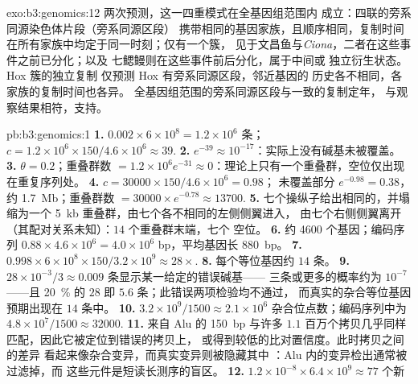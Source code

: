 \begin{solution}{exo:b3:genomics:12}
两次预测，这一四重模式在全基因组范围内
成立：四联的旁系同源染色体片段（旁系同源区段）
携带相同的基因家族，且顺序相同，复制时间
在所有家族中均定于同一时刻；仅有一个簇，
见于文昌鱼与\emph{Ciona}，二者在这些事件之前已分化；以及
七鳃鳗则在这些事件前后分化，属于中间或
独立衍生状态。Hox 簇的独立复制
仅预测 Hox 有旁系同源区段，邻近基因的
历史各不相同，各家族的复制时间也各异。
全基因组范围的旁系同源区段与一致的复制定年，
与观察结果相符，支持。
\end{solution}

\begin{solution}{pb:b3:genomics:1}
\textbf{1.} $0.002\times 6\times 10^{8} = 1.2\times 10^{6}$ 条；
$c = 1.2\times 10^{6}\times 150/4.6\times 10^{6} \approx 39$.
\textbf{2.} $e^{-39} \approx 10^{-17}$：实际上没有碱基未被覆盖。
\textbf{3.} $\theta = 0.2$；重叠群数 $= 1.2\times 10^{6} e^{-31} \approx
0$：理论上只有一个重叠群，空位仅出现在重复序列处。
\textbf{4.} $c = \num{30000}\times 150/4.6\times 10^{6} = 0.98$；
未覆盖部分 $e^{-0.98} = 0.38$，约 \qty{1.7}{Mb}；重叠群数 $= \num{30000}
\times e^{-0.78} \approx \num{13700}$.
\textbf{5.} 七个操纵子给出相同的，并塌缩为一个
\qty{5}{kb} 重叠群，由七个各不相同的左侧侧翼进入，
由七个右侧侧翼离开（其配对关系未知）：$14$ 个重叠群末端，七个
空位。
\textbf{6.} 约 \num{4600} 个基因；编码序列 $0.88\times 4.6\times 10^{6}
= 4.0\times 10^{6}$ bp，平均基因长 \qty{880}{bp}。
\textbf{7.} $0.998\times 6\times 10^{8}\times 150/3.2\times 10^{9}
\approx 28\times$.
\textbf{8.} 每个等位基因约 $14$ 条。
\textbf{9.} $28\times 10^{-3}/3 \approx 0.009$ 条显示某一给定的错误碱基——
三条或更多的概率约为 $10^{-7}$——且
\qty{20}{\%} 的 $28$ 即 $5.6$ 条；此错误两项检验均不通过，
而真实的杂合等位基因预期出现在 $14$ 条中。
\textbf{10.} $3.2\times 10^{9}/1500 \approx 2.1\times 10^{6}$
杂合位点数；编码序列中为 $4.8\times 10^{7}/1500 \approx
\num{32000}$.
\textbf{11.} 来自 Alu 的 \qty{150}{bp} 与许多 $1.1$
百万个拷贝几乎同样匹配，因此它被定位到错误的拷贝上，
或得到较低的比对置信度。此时拷贝之间的差异
看起来像杂合变异，而真实变异则被隐藏其中
：Alu 内的变异检出通常被过滤掉，而
这些元件是短读长测序的盲区。
\textbf{12.} $1.2\times 10^{-8}\times 6.4\times 10^{9} \approx 77$ 个新

\end{solution}
